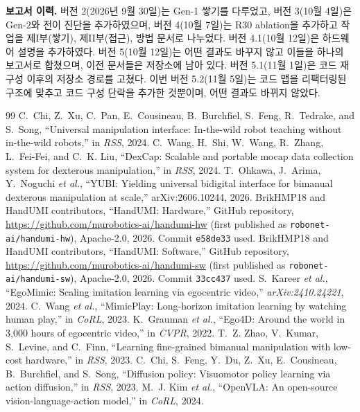 \documentclass[conference,10pt]{IEEEtran}
\begin{document}
\textbf{보고서 이력.} 버전 2(2026년 9월 30일)는 Gen-1 쌓기를 다루었고, 버전 3(10월 4일)은 Gen-2와 전이 진단을 추가하였으며, 버전
4(10월 7일)는 R30 ablation을 추가하고 작업을 제I부(쌓기), 제II부(접근), 방법 문서로 나누었다. 버전 4.1(10월 12일)은 하드웨어 설명을
추가하였다. 버전 5(10월 12일)는 어떤 결과도 바꾸지 않고 이들을 하나의 보고서로 합쳤으며, 이전 문서들은 저장소에 남아 있다. 버전 5.1(11월 1일)은 코드
재구성 이후의 저장소 경로를 고쳤다. 이번 버전 5.2(11월 5일)는 코드 맵을 리팩터링된 구조에 맞추고 코드 구성 단락을 추가한 것뿐이며,
어떤 결과도 바뀌지 않았다.

\begin{thebibliography}{99}\footnotesize
{} C.~Chi, Z.~Xu, C.~Pan, E.~Cousineau, B.~Burchfiel, S.~Feng, R.~Tedrake, and S.~Song, ``Universal manipulation interface: In-the-wild robot teaching without in-the-wild robots,'' in \emph{RSS}, 2024.
 C.~Wang, H.~Shi, W.~Wang, R.~Zhang, L.~Fei-Fei, and C.~K. Liu, ``DexCap: Scalable and portable mocap data collection system for dexterous manipulation,'' in \emph{RSS}, 2024.
 T.~Ohkawa, J.~Arima, Y.~Noguchi \emph{et al.}, ``YUBI: Yielding universal bidigital interface for bimanual dexterous manipulation at scale,'' arXiv:2606.10244, 2026.
 BrikHMP18 and HandUMI contributors, ``HandUMI: Hardware,'' GitHub repository, \url{https://github.com/murobotics-ai/handumi-hw} (first published as \texttt{robonet-ai/handumi-hw}), Apache-2.0, 2026. Commit \texttt{e58de33} used.
 BrikHMP18 and HandUMI contributors, ``HandUMI: Software,'' GitHub repository, \url{https://github.com/murobotics-ai/handumi-sw} (first published as \texttt{robonet-ai/handumi-sw}), Apache-2.0, 2026. Commit \texttt{33cc437} used.
 S.~Kareer \emph{et al.}, ``EgoMimic: Scaling imitation learning via egocentric video,'' \emph{arXiv:2410.24221}, 2024.
 C.~Wang \emph{et al.}, ``MimicPlay: Long-horizon imitation learning by watching human play,'' in \emph{CoRL}, 2023.
 K.~Grauman \emph{et al.}, ``Ego4D: Around the world in 3,000 hours of egocentric video,'' in \emph{CVPR}, 2022.
 T.~Z. Zhao, V.~Kumar, S.~Levine, and C.~Finn, ``Learning fine-grained bimanual manipulation with low-cost hardware,'' in \emph{RSS}, 2023.
 C.~Chi, S.~Feng, Y.~Du, Z.~Xu, E.~Cousineau, B.~Burchfiel, and S.~Song, ``Diffusion policy: Visuomotor policy learning via action diffusion,'' in \emph{RSS}, 2023.
 M.~J. Kim \emph{et al.}, ``OpenVLA: An open-source vision-language-action model,'' in \emph{CoRL}, 2024.

\end{thebibliography}
\end{document}
